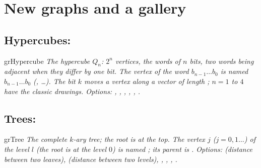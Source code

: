\section{New graphs and a gallery}
\SetVertexLabel
\SetUpEdge[style = {pos=.5}]
\GraphInit[vstyle=Normal]
\subsection{Hypercubes: }
\begin{NewMacroBox}{grHypercube}{}
\emph{The hypercube $Q_n$: $2^n$ vertices, the words of $n$ bits, two words
being adjacent when they differ by one bit. The vertex of the word
$b_{n-1}\dots b_0$ is named $b_{n-1}\dots b_0$
(, \dots). The bit $k$ moves a vertex along a
vector of length ; $n=1$ to $4$ have the classic drawings.
Options: , , , ,
, .}
\end{NewMacroBox}

\begin{tkzexample}
\end{tkzexample}

\subsection{Trees: }
\begin{NewMacroBox}{grTree}{}
\emph{The complete $k$-ary tree; the root is at the top. The vertex $j$
($j=0,1\dots$) of the level $l$ (the root is at the level $0$) is named
; its parent is .
Options:  (distance between two leaves), 
(distance between two levels), , ,
, .}
\end{NewMacroBox}

